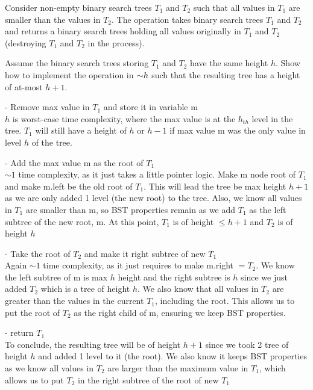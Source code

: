 \begin{problem}
Consider non-empty binary search trees $T_1$ and $T_2$ such that all values in $T_1$ are smaller than the values in $T_2$. The  operation takes binary search trees $T_1$ and $T_2$ and returns a binary search trees holding all values originally in $T_1$ and $T_2$ (destroying $T_1$ and $T_2$ in the process). 
\begin{questions}
\item Assume the binary search trees storing $T_1$ and $T_2$ have the same height $h$. Show how to implement the  operation in $\mathord{\sim}h$ such that the resulting tree has a height of at-most $h+1$.

- Remove max value in $T_1$ and store it in variable m\\
$h$ is worst-case time complexity, where the max value is at the $h_{th}$ level in the tree. $T_1$ will still have a height of $h$ or $h-1$ if max value m was the only value in level $h$ of the tree.

- Add the max value m as the root of $T_1$\\
$\sim 1$ time complexity, as it just takes a little pointer logic. Make m node root of $T_1$ and make m.left be the old root of $T_1$. This will lead the tree be max height $h+1$ as we are only added 1 level (the new root) to the tree.
Also, we know all values in $T_1$ are smaller than m, so BST properties remain as we add $T_1$ as the left subtree of the new root, m.
At this point, $T_1$ is of height $ \leq h+1$ and $T_2$ is of height $h$

- Take the root of $T_2$ and make it right subtree of new $T_1$\\
Again $\sim 1$ time complexity, as it just requires to make m.right $ = T_2$. We know the left subtree of m is max $h$ height and the right subtree is $h$ since we just added $T_2$ which is a tree of height $h$.
We also know that all values in $T_2$ are greater than the values in the current $T_1$, including the root. This allows us to put the root of $T_2$ as the right child of m, ensuring we keep BST properties.

- return $T_1$\\

To conclude, the resulting tree will be of height $h+1$ since we took 2 tree of height $h$ and added 1 level to it (the root). We also know it keeps BST properties as we know all values in $T_2$ are larger than the maximum value in $T_1$, which allows us to put $T_2$ in the right subtree of the root of new $T_1$


\end{questions}
\end{problem}
